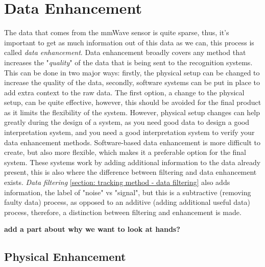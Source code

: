 \section{Data Enhancement}
\label{section: tracking method - data enhancement}


The data that comes from the mmWave sensor is quite sparse, thus, it's important to get as much information out of this data as we can, this process is called \textit{data enhancement}.
Data enhancement broadly covers any method that increases the "\textit{quality}" of the data that is being sent to the recognition systems.
This can be done in two major ways: firstly, the physical setup can be changed to increase the quality of the data, secondly, software systems can be put in place to add extra context to the raw data.
The first option, a change to the physical setup, can be quite effective, however, this should be avoided for the final product as it limits the flexibility of the system.
However, physical setup changes can help greatly during the design of a system, as you need good data to design a good interpretation system, and you need a good interpretation system to verify your data enhancement methods.
Software-based data enhancement is more difficult to create, but also more flexible, which makes it a preferable option for the final system.
These systems work by adding additional information to the data already present, this is also where the difference between filtering and data enhancement exists.
\textit{Data filtering} \ref{section: tracking method - data filtering} also adds information, the label of "noise" vs "signal", but this is a subtractive (removing faulty data) process, as opposed to an additive (adding additional useful data) process, therefore, a distinction between filtering and enhancement is made.

\textbf{add a part about why we want to look at hands?}

\subsection{Physical Enhancement}
\label{sub-section: tracking method - data enhancement - physical enhancement}


